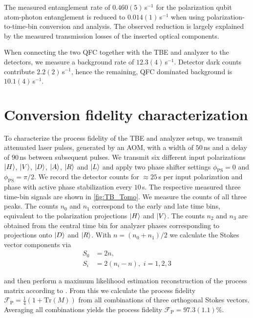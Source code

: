 \documentclass[reprint, superscriptaddress, longbibliography, floatfix, twocolumn, nofootinbib, amsmath, amssymb, aps, showkeys]{revtex4-2}
\begin{document}
The measured entanglement rate of $0.460(5)\,$s$^{-1}$ for the polarization qubit atom-photon entanglement is reduced to $0.014(1)\,$s$^{-1}$  when using polarization-to-time-bin conversion and analysis. The observed reduction is largely explained by the measured transmission losses of the inserted optical components.

When connecting the two QFC together with the TBE and analyzer to the detectors, we measure a background rate of $12.3(4)\,$s$^{-1}$. Detector dark counts contribute $2.2(2)\,$s$^{-1}$, hence the remaining, QFC dominated background is $10.1(4)\,$s$^{-1}$.


\section{Conversion fidelity characterization}\label{app:conv_fid}

To characterize the process fidelity of the TBE and analyzer setup, we transmit attenuated laser pulses, generated by an AOM, with a width of $50\,$ns and a delay of $90\,$ns between subsequent pulses. We transmit six different input polarizations $\ket{H}$, $\ket{V}$, $\ket{D}$, $\ket{A}$, $\ket{R}$ and $\ket{L}$ and apply two phase shifter settings $\phi_\mathrm{PS}=0$ and $\phi_\mathrm{PS}=\pi/2$. We record the detector counts for $\approx 25\,$s per input polarization and phase with active phase stabilization every $10\,$s. The respective measured three time-bin signals are shown in \autoref{fig:TB_Tomo}. We measure the counts of all three peaks. The counts $n_0$ and $n_1$ correspond to the early and late time bins, equivalent to the polarization projections $\ket{H}$ and $\ket{V}$. The counts $n_2$ and $n_3$ are obtained from the central time bin for analyzer phases corresponding to projections onto $\ket{D}$ and $\ket{R}$. With $n=(n_0+n_1)/2$ we calculate the Stokes vector components via
\begin{align}
    S_0&=2n,\\
    S_i&=2(n_i-n),\,\,i=1,2,3
\end{align}

and then perform a maximum likelihood estimation reconstruction of the process matrix according to \cite{James_2001}.
From this we calculate the process fidelity $\mathcal{F}_\mathrm{P}=\frac{1}{4}\left(1+\mathrm{Tr}(M)\right)$ from all combinations of three orthogonal Stokes vectors. Averaging all combinations yields the process fidelity $\mathcal{F}_\mathrm{P}=97.3(1.1)\%$.



\end{document}
